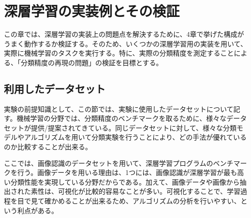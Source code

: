 \chapter{深層学習の実装例とその検証}
この章では、深層学習の実装上の問題点を解決するために、4章で挙げた構成がうまく動作するか検証する。そのため、いくつかの深層学習用の実装を用いて、実際に機械学習のタスクを実行する。特に、実際の分類精度を測定することによる、「分類精度の再現の問題」の検証を目標とする。

\section{利用したデータセット}
実験の前提知識として、この節では、実験に使用したデータセットについて記す。機械学習の分野では、分類精度のベンチマークを取るために、様々なデータセットが提供/提案されてきている。同じデータセットに対して、様々な分類モデルやアルゴリズムを用いて分類実験を行うことにより、どの手法が優れているのか比較することが出来る。\par
ここでは、画像認識のデータセットを用いて、深層学習プログラムのベンチマークを行う。画像データを用いる理由は、1つには、画像認識が深層学習が最も高い分類性能を実現している分野だからである。加えて、画像データや画像から抽出された素性は、可視化が比較的容易なことが多い。可視化することで、学習過程を目で見て確かめることが出来るため、アルゴリズムの分析を行いやすい、という利点がある。
